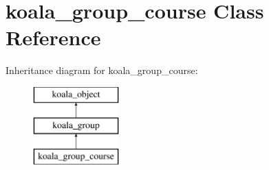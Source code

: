 \hypertarget{classkoala__group__course}{
\section{koala\_\-group\_\-course Class Reference}
\label{classkoala__group__course}
}
Inheritance diagram for koala\_\-group\_\-course:\begin{figure}[H]
\begin{center}
\leavevmode
\includegraphics[height=3.000000cm]{classkoala__group__course}
\end{center}
\end{figure}
